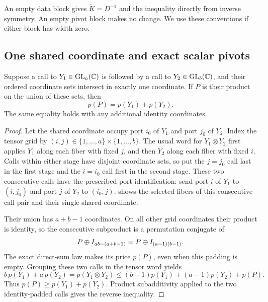An empty data block gives $\widetilde K=D^{-1}$ and the inequality
directly from inverse symmetry. An empty pivot block makes no change.
We use these conventions if either block has width zero.

\subsection{One shared coordinate and exact scalar pivots}

\begin{lemma}\label{pivot:lem:one-port}
Suppose a call to $Y_1\in\operatorname{GL}_a(\mathbb C)$ is followed by a call to
$Y_2\in\operatorname{GL}_b(\mathbb C)$, and their ordered coordinate sets intersect in
exactly one coordinate. If $P$ is their product on the union of these
sets, then
\[
 p(P)=p(Y_1)+p(Y_2).
\]
The same equality holds with any additional identity coordinates.
\end{lemma}

\begin{proof}
Let the shared coordinate occupy port $i_0$ of $Y_1$ and port $j_0$
of $Y_2$. Index the tensor grid by
$(i,j)\in\{1,\ldots,a\}\times\{1,\ldots,b\}$.
The usual word for $Y_1\otimes Y_2$ first applies $Y_1$ along each
fiber with fixed $j$, and then $Y_2$ along each fiber with fixed $i$.
Calls within either stage have disjoint coordinate sets, so put the
$j=j_0$ call last in the first stage and the $i=i_0$ call first in the
second stage. These two consecutive calls have the prescribed port
identification: send port $i$ of $Y_1$ to $(i,j_0)$ and port $j$ of
$Y_2$ to $(i_0,j)$.
 shows the selected fibers of this
consecutive call pair and their single shared coordinate.

Their union has $a+b-1$ coordinates. On all other grid coordinates
their product is identity, so the consecutive subproduct is a
permutation conjugate of
\[
 P\oplus I_{ab-(a+b-1)}
   =P\oplus I_{(a-1)(b-1)}.
\]
The exact direct-sum law makes its price $p(P)$, even when this padding
is empty. Grouping these two calls in the tensor word yields
\[
 b\,p(Y_1)+a\,p(Y_2)
 =p(Y_1\otimes Y_2)
 \le (b-1)p(Y_1)+(a-1)p(Y_2)+p(P).
\]
Thus $p(P)\ge p(Y_1)+p(Y_2)$. Product subadditivity applied to the
two identity-padded calls gives the reverse inequality.
\end{proof}


